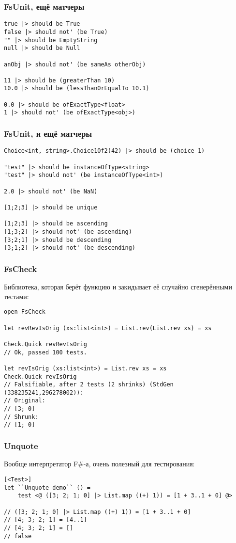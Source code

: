 \documentclass[xetex,mathserif,serif]{beamer}
\begin{document}
	\begin{frame}[fragile]
		\frametitle{FsUnit, ещё матчеры}
		\begin{verbatim}
true |> should be True
false |> should not' (be True)
"" |> should be EmptyString
null |> should be Null

anObj |> should not' (be sameAs otherObj)

11 |> should be (greaterThan 10)
10.0 |> should be (lessThanOrEqualTo 10.1)

0.0 |> should be ofExactType<float>
1 |> should not' (be ofExactType<obj>)
		\end{verbatim}
\end{frame}

	\begin{frame}[fragile]
		\frametitle{FsUnit, и ещё матчеры}
		\begin{verbatim}
Choice<int, string>.Choice1Of2(42) |> should be (choice 1)

"test" |> should be instanceOfType<string>
"test" |> should not' (be instanceOfType<int>)

2.0 |> should not' (be NaN)

[1;2;3] |> should be unique

[1;2;3] |> should be ascending
[1;3;2] |> should not' (be ascending)
[3;2;1] |> should be descending
[3;1;2] |> should not' (be descending)
		\end{verbatim}
\end{frame}

	\begin{frame}[fragile]
		\frametitle{FsCheck}
		Библиотека, которая берёт функцию и закидывает её случайно сгенерёнными тестами:
		\begin{verbatim}
open FsCheck

let revRevIsOrig (xs:list<int>) = List.rev(List.rev xs) = xs

Check.Quick revRevIsOrig
// Ok, passed 100 tests.

let revIsOrig (xs:list<int>) = List.rev xs = xs
Check.Quick revIsOrig
// Falsifiable, after 2 tests (2 shrinks) (StdGen (338235241,296278002)):
// Original:
// [3; 0]
// Shrunk:
// [1; 0]
		\end{verbatim}
\end{frame}

	\begin{frame}[fragile]
		\frametitle{Unquote}
		Вообще интерпретатор F\#-а, очень полезный для тестирования:
		\begin{verbatim}
[<Test>]
let ``Unquote demo`` () =
    test <@ ([3; 2; 1; 0] |> List.map ((+) 1)) = [1 + 3..1 + 0] @>

// ([3; 2; 1; 0] |> List.map ((+) 1)) = [1 + 3..1 + 0]
// [4; 3; 2; 1] = [4..1]
// [4; 3; 2; 1] = []
// false
		\end{verbatim}
\end{frame}
\end{document}
